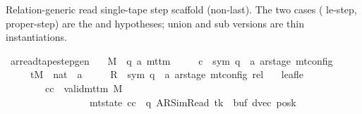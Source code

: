 \begin{isabellebody}
\begin{isamarkuptext}
Relation-generic read single-tape step scaffold (non-last).
  The two cases ( le-step,  proper-step)
  are the  and  hypotheses; union and
  sub versions are thin instantiations.%
\end{isamarkuptext}\isamarkuptrue%
\isamarkupfalse%
\ ar{\isacharunderscore}{\kern0pt}read{\isacharunderscore}{\kern0pt}tape{\isacharunderscore}{\kern0pt}step{\isacharunderscore}{\kern0pt}gen{\isacharcolon}{\kern0pt}\isanewline
\ \ \ M\ {\isacharcolon}{\kern0pt}{\isacharcolon}{\kern0pt}\ {\isachardoublequoteopen}{\isacharparenleft}{\kern0pt}{\isacharprime}{\kern0pt}q{\isacharcomma}{\kern0pt}\ {\isacharprime}{\kern0pt}a{\isacharparenright}{\kern0pt}\ mttm{\isachardoublequoteclose}\isanewline
\ \ \ \ \ c{\isacharprime}{\kern0pt}\ {\isacharcolon}{\kern0pt}{\isacharcolon}{\kern0pt}\ {\isachardoublequoteopen}{\isacharparenleft}{\kern0pt}sym{}{\isacharcomma}{\kern0pt}\ {\isacharprime}{\kern0pt}q\ {\isasymtimes}\ {\isacharprime}{\kern0pt}a\ ar{\isacharunderscore}{\kern0pt}stage{\isacharparenright}{\kern0pt}\ mt{\isacharunderscore}{\kern0pt}config{\isachardoublequoteclose}\isanewline
\ \ \ \ \ tM\ {\isacharcolon}{\kern0pt}{\isacharcolon}{\kern0pt}\ {\isachardoublequoteopen}nat\ {\isasymRightarrow}\ {\isacharprime}{\kern0pt}a{\isachardoublequoteclose}\isanewline
\ \ \ \ \ R{\isacharprime}{\kern0pt}\ {\isacharcolon}{\kern0pt}{\isacharcolon}{\kern0pt}\ {\isachardoublequoteopen}{\isacharparenleft}{\kern0pt}sym{}{\isacharcomma}{\kern0pt}\ {\isacharprime}{\kern0pt}q\ {\isasymtimes}\ {\isacharprime}{\kern0pt}a\ ar{\isacharunderscore}{\kern0pt}stage{\isacharparenright}{\kern0pt}\ mt{\isacharunderscore}{\kern0pt}config\ rel{\isachardoublequoteclose}\isanewline
\ \ \ leaf{\isacharunderscore}{\kern0pt}le{\isacharcolon}{\kern0pt}\isanewline
\ \ \ \ \ \ \ \ {\isachardoublequoteopen}{\isasymAnd}cc{\isachardot}{\kern0pt}\ {\isasymlbrakk}\ valid{\isacharunderscore}{\kern0pt}mttm\ M{\isacharsemicolon}{\kern0pt}\isanewline
\ \ \ \ \ \ \ \ \ \ \ \ \ \ \ \ \ mt{\isacharunderscore}{\kern0pt}state\ cc\ {\isacharequal}{\kern0pt}\ {\isacharparenleft}{\kern0pt}q{\isacharcomma}{\kern0pt}\ AR{\isacharunderscore}{\kern0pt}SimRead{\isacharcomma}{\kern0pt}\ tk{\isacharcomma}{\kern0pt}\ {}{\isacharcomma}{\kern0pt}\ buf{\isacharcomma}{\kern0pt}\ dvec{\isacharcomma}{\kern0pt}\ posk{\isacharparenright}{\kern0pt}{\isacharsemicolon}{\kern0pt}\isanewline

\end{isabellebody}
